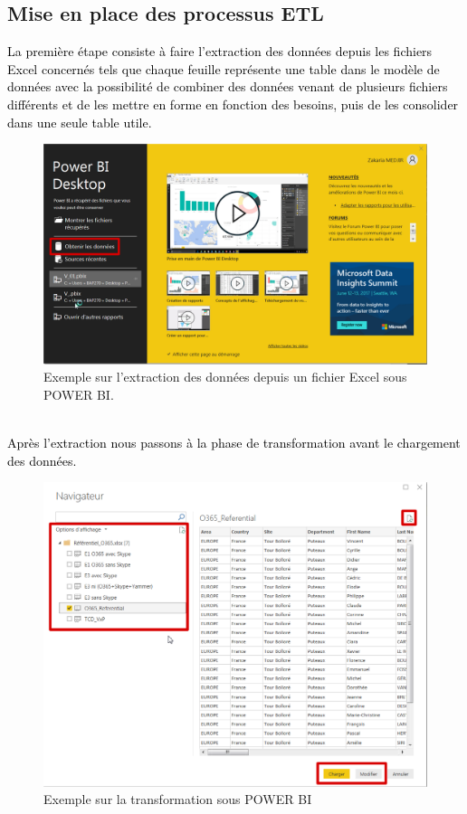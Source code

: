 \subsection*{Mise en place des processus ETL}

\textcolor{black}{La première étape consiste à faire l’extraction des données depuis les fichiers Excel concernés tels que chaque feuille représente une table dans le modèle de données avec la possibilité de combiner des données venant de plusieurs fichiers différents et de les mettre en forme en fonction des besoins, puis de les consolider dans une seule table utile.}
\begin{figure}[H]
	\begin{center}
		\includegraphics[width=0.70\linewidth]{Projet_O365/extraction}
\end{center}
	\caption{Exemple sur l’extraction des données depuis un fichier Excel sous POWER BI.}
	\label{fig:14}	
\end{figure}
~~\\
\textcolor{black}{Après l’extraction nous passons à la phase de transformation avant  le chargement des données.}

\begin{figure}[H]
	\begin{center}
		\includegraphics[width=0.8\linewidth]{Projet_O365/modification}
\end{center}
	\caption{Exemple sur la transformation sous POWER BI}
	\label{fig:15}	
\end{figure}

